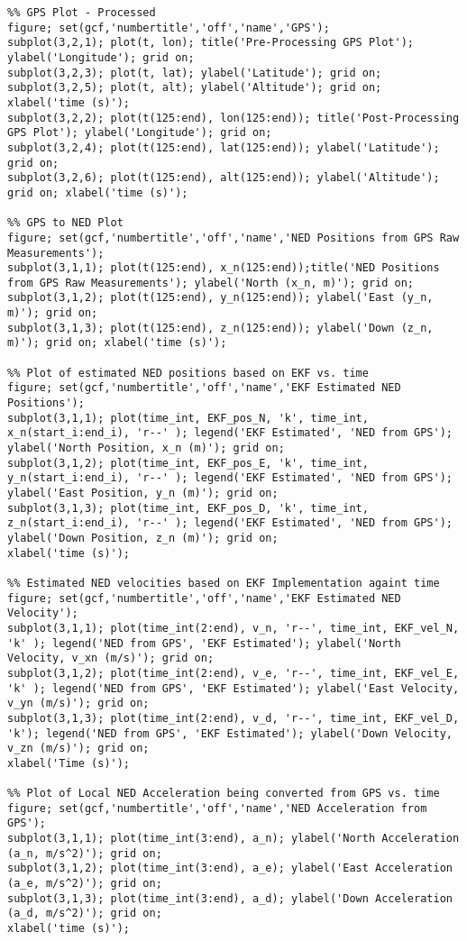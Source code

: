 \begin{lstlisting}
%% GPS Plot - Processed
figure; set(gcf,'numbertitle','off','name','GPS');  
subplot(3,2,1); plot(t, lon); title('Pre-Processing GPS Plot'); ylabel('Longitude'); grid on;
subplot(3,2,3); plot(t, lat); ylabel('Latitude'); grid on;
subplot(3,2,5); plot(t, alt); ylabel('Altitude'); grid on; xlabel('time (s)');
subplot(3,2,2); plot(t(125:end), lon(125:end)); title('Post-Processing GPS Plot'); ylabel('Longitude'); grid on;
subplot(3,2,4); plot(t(125:end), lat(125:end)); ylabel('Latitude'); grid on;
subplot(3,2,6); plot(t(125:end), alt(125:end)); ylabel('Altitude'); grid on; xlabel('time (s)');

%% GPS to NED Plot
figure; set(gcf,'numbertitle','off','name','NED Positions from GPS Raw Measurements');  
subplot(3,1,1); plot(t(125:end), x_n(125:end));title('NED Positions from GPS Raw Measurements'); ylabel('North (x_n, m)'); grid on;
subplot(3,1,2); plot(t(125:end), y_n(125:end)); ylabel('East (y_n, m)'); grid on;
subplot(3,1,3); plot(t(125:end), z_n(125:end)); ylabel('Down (z_n, m)'); grid on; xlabel('time (s)');

%% Plot of estimated NED positions based on EKF vs. time
figure; set(gcf,'numbertitle','off','name','EKF Estimated NED Positions');  
subplot(3,1,1); plot(time_int, EKF_pos_N, 'k', time_int, x_n(start_i:end_i), 'r--' ); legend('EKF Estimated', 'NED from GPS'); ylabel('North Position, x_n (m)'); grid on;
subplot(3,1,2); plot(time_int, EKF_pos_E, 'k', time_int, y_n(start_i:end_i), 'r--' ); legend('EKF Estimated', 'NED from GPS'); ylabel('East Position, y_n (m)'); grid on;
subplot(3,1,3); plot(time_int, EKF_pos_D, 'k', time_int, z_n(start_i:end_i), 'r--' ); legend('EKF Estimated', 'NED from GPS'); ylabel('Down Position, z_n (m)'); grid on;
xlabel('time (s)');

%% Estimated NED velocities based on EKF Implementation againt time
figure; set(gcf,'numbertitle','off','name','EKF Estimated NED Velocity');  
subplot(3,1,1); plot(time_int(2:end), v_n, 'r--', time_int, EKF_vel_N, 'k' ); legend('NED from GPS', 'EKF Estimated'); ylabel('North Velocity, v_xn (m/s)'); grid on;
subplot(3,1,2); plot(time_int(2:end), v_e, 'r--', time_int, EKF_vel_E, 'k' ); legend('NED from GPS', 'EKF Estimated'); ylabel('East Velocity, v_yn (m/s)'); grid on;
subplot(3,1,3); plot(time_int(2:end), v_d, 'r--', time_int, EKF_vel_D, 'k'); legend('NED from GPS', 'EKF Estimated'); ylabel('Down Velocity, v_zn (m/s)'); grid on;
xlabel('Time (s)');

%% Plot of Local NED Acceleration being converted from GPS vs. time
figure; set(gcf,'numbertitle','off','name','NED Acceleration from GPS');  
subplot(3,1,1); plot(time_int(3:end), a_n); ylabel('North Acceleration (a_n, m/s^2)'); grid on;
subplot(3,1,2); plot(time_int(3:end), a_e); ylabel('East Acceleration (a_e, m/s^2)'); grid on;
subplot(3,1,3); plot(time_int(3:end), a_d); ylabel('Down Acceleration (a_d, m/s^2)'); grid on;
xlabel('time (s)');


\end{lstlisting}
